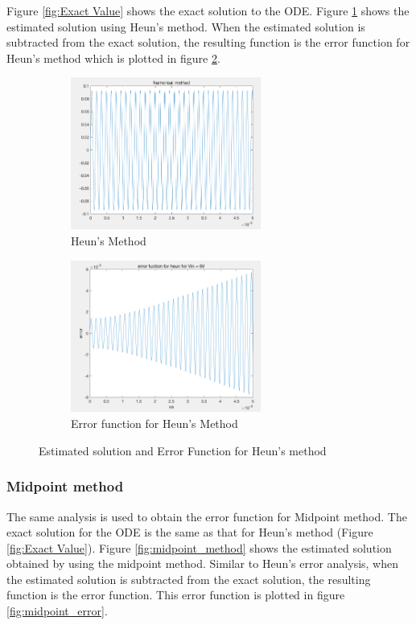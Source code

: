 \documentclass[11pt,a4paper]{article}
\begin{document}
Figure \ref{fig:Exact Value} shows the exact solution to the ODE. Figure \ref{fig:Heun Method} shows the estimated solution using Heun's method. When the estimated solution is subtracted from the exact solution, the resulting function is the error function for Heun's method which is plotted in figure \ref{fig:heun_error}.

\begin{figure}[h]
\begin{subfigure}{.5\textwidth}
  \includegraphics[width=.9\linewidth,height = 5cm
  ]{Ex2_Figs/heun_error_numerical_method}
  \caption[right]{Heun's Method}
  \label{fig:Heun Method}
\end{subfigure}
\begin{subfigure}{.5\textwidth}
  \includegraphics[width=.9\linewidth,height = 5cm]{Ex2_Figs/heun_error}
  \caption{Error function for Heun's Method}
  \label{fig:heun_error}
\end{subfigure}
\caption{Estimated solution and Error Function for Heun's method}
\label{fig:Heun_Error_sub}
\end{figure}





\clearpage

\subsubsection{Midpoint method}
The same analysis is used to obtain the error function for Midpoint method. The exact solution for the ODE is the same as that for Heun's method (Figure \ref{fig:Exact Value}).  Figure \ref{fig:midpoint_method} shows the estimated solution obtained by using the midpoint method. Similar to Heun's error analysis, when the estimated solution is subtracted from the exact solution, the resulting function is the error function. This error function is plotted in figure \ref{fig:midpoint_error}.
\end{document}
